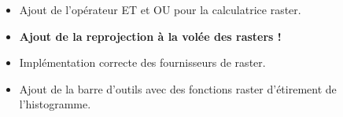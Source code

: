 
\begin{itemize}[label=--]
\item Ajout de l'opérateur ET et OU pour la calculatrice raster.
\item \textbf{Ajout de la reprojection à la volée des rasters !} 
\item Implémentation correcte des fournisseurs de raster. 
\item Ajout de la barre d'outils avec des fonctions raster d'étirement de l'histogramme. 
\end{itemize}


